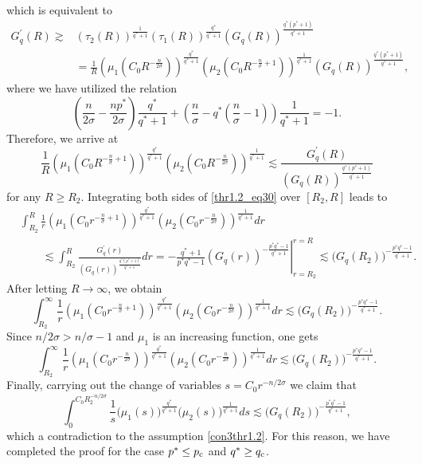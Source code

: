 \documentclass[11pt,reqno]{amsart}
\newcommand{\tron}[1]{\left( #1 \right)}
\numberwithin{equation}{section}
\begin{document}
which is equivalent to
\begin{align*}
G_q^{\prime}(R) \gtrsim & \left(\tau_2(R)\right)^{\frac{1}{q^*+1}}\left(\tau_1(R)\right)^{\frac{q^*}{q^*+1}}\left(G_q(R)\right)^{\frac{q^*\left(p^*+1\right)}{q^*+1}} \nonumber\\
& =\frac{1}{R}\left(\mu_1\left(C_0 R^{-\frac{n}{2\sigma}}\right)\right)^{\frac{q^*}{q^*+1}}\left(\mu_2\left(C_0 R^{-\frac{n}{\sigma}+1}\right)\right)^{\frac{1}{q^*+1}}\left(G_q(R)\right)^{\frac{q^*\left(p^*+1\right)}{q^*+1}},
\end{align*}
where we have utilized the relation
\[
\tron{\frac{n}{2\sigma}-\frac{np^*}{2\sigma}}\frac{q^*}{q^*+1}+\tron{\frac{n}{\sigma}-q^*\tron{\frac{n}{\sigma}-1}}\frac{1}{q^*+1}=-1.
\]
Therefore, we arrive at
\begin{equation}\label{thr1.2_eq30}
\frac{1}{R}\left(\mu_1\left(C_0 R^{-\frac{n}{\sigma}+1}\right)\right)^{\frac{q^*}{q^*+1}}\left(\mu_2\left(C_0 R^{-\frac{n}{2\sigma}}\right)\right)^{\frac{1}{q^*+1}} \lesssim \frac{G_q^{\prime}(R)}{\left(G_q(R)\right)^{\frac{q^*\left(p^*+1\right)}{q^*+1}}}
\end{equation}
for any $R\geq R_2$. Integrating both sides of \eqref{thr1.2_eq30} over $[R_2,R]$ leads to
\[
\begin{aligned}
& \int_{R_2}^{R} \frac{1}{r}\left(\mu_1\left(C_0 r^{-\frac{n}{\sigma}+1}\right)\right)^{\frac{q^*}{q^*+1}}\left(\mu_2\left(C_0 r^{-\frac{n}{2\sigma}}\right)\right)^{\frac{1}{q^*+1}} d r \\
&\qquad \lesssim \int_{R_2}^{R} \frac{G_q^{\prime}(r)}{\left(G_q(r)\right)^{\frac{q^*\left(p^*+1\right)}{q^*+1}}} d r=-\left.\frac{q^*+1}{p^* q^*-1}\left(G_q(r)\right)^{-\frac{p^*q^*-1}{q^*+1}}\right|_{r=R_2}^{r=R} \lesssim \big(G_q\left(R_2\right)\big)^{-\frac{p^*q^*-1}{q^*+1}}.
\end{aligned}
\]
After letting $R\to \infty$, we obtain
\[
\int_{R_2}^{\infty} \frac{1}{r}\left(\mu_1\left(C_0 r^{-\frac{n}{\sigma}+1}\right)\right)^{\frac{q^*}{q^*+1}}\left(\mu_2\left(C_0 r^{-\frac{n}{2\sigma}}\right)\right)^{\frac{1}{q^*+1}} d r\lesssim \big(G_q\left(R_2\right)\big)^{-\frac{p^*q^*-1}{q^*+1}}.
\]
Since $n/2\sigma>n/\sigma-1$ and $\mu_1$ is an increasing function, one gets
\[
\int_{R_2}^{\infty} \frac{1}{r}\left(\mu_1\left(C_0 r^{-\frac{n}{2\sigma}}\right)\right)^{\frac{q^*}{q^*+1}}\left(\mu_2\left(C_0 r^{-\frac{n}{2\sigma}}\right)\right)^{\frac{1}{q^*+1}} d r\lesssim \big(G_q\left(R_2\right)\big)^{-\frac{p^*q^*-1}{q^*+1}}.
\]
Finally, carrying out the change of variables $s=C_0 r^{-n/2\sigma}$ we claim that
$$
\int_0^{C_0 R_2^{-n/2\sigma}}\frac{1}{s}\big(\mu_1(s)\big)^{\frac{q^*}{q^*+1}}\big(\mu_2(s)\big)^{\frac{1}{q^*+1}} d s \lesssim \big(G_q\left(R_2\right)\big)^{-\frac{p^*q^*-1}{q^*+1}},
$$
which a contradiction to the assumption \eqref{con3thr1.2}. For this reason, we have completed the proof for the case $p^*\leq p_{\rm c}$ and $q^*\geq q_{\rm c}$. 
\end{document}
